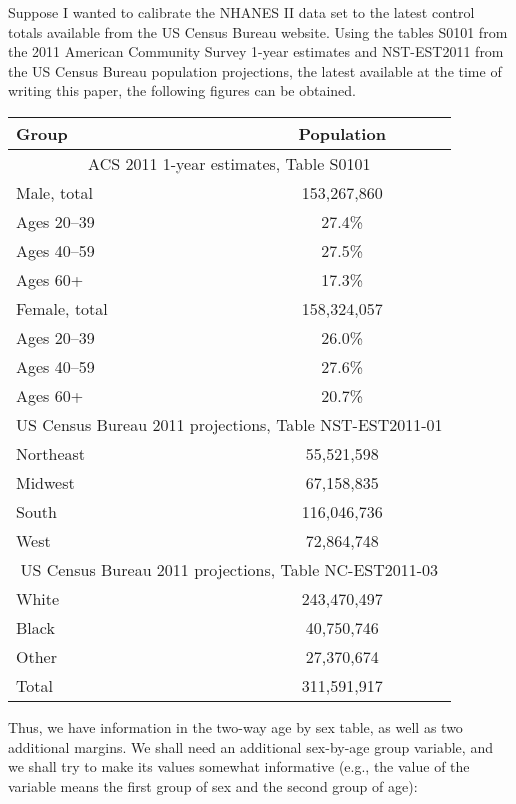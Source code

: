 \begin{stexample}[Example 2]

Suppose I wanted to calibrate
the NHANES II data set to the latest control totals available
from the US Census Bureau website. Using the tables
S0101 from the 2011 American Community Survey 1-year estimates
and NST-EST2011 from the US Census Bureau population projections,
the latest available at the time of writing this paper,
the following figures can be obtained.

\begin{tabular}{lc}
    Group & Population \\
    \hline
    \multicolumn{2}{c}{ACS 2011 1-year estimates, Table S0101} \\
    Male, total & 153,267,860 \\
    Ages 20--39 & 27.4\% \\
    Ages 40--59 & 27.5\% \\
    Ages 60+    & 17.3\% \\
    Female, total & 158,324,057 \\
    Ages 20--39 & 26.0\% \\
    Ages 40--59 & 27.6\% \\
    Ages 60+    & 20.7\% \\
    \multicolumn{2}{c}{US Census Bureau 2011 projections, Table NST-EST2011-01} \\
    Northeast & 55,521,598 \\
    Midwest   & 67,158,835 \\
    South     & 116,046,736 \\
    West      & 72,864,748 \\
    \multicolumn{2}{c}{US Census Bureau 2011 projections, Table NC-EST2011-03} \\
    White     & 243,470,497 \\
    Black     & 40,750,746 \\
    Other     & 27,370,674 \\
    \hline
    Total     & 311,591,917
\end{tabular}

Thus, we have information in the two-way age by sex table, as well
as two additional margins. We shall need an additional sex-by-age group variable,
and we shall try to make its values somewhat informative
(e.g., the value  of the variable  means 
the first group of sex and the second group of age):

\begin{stlog}
\nullskip
\end{stlog}


\end{stexample}
